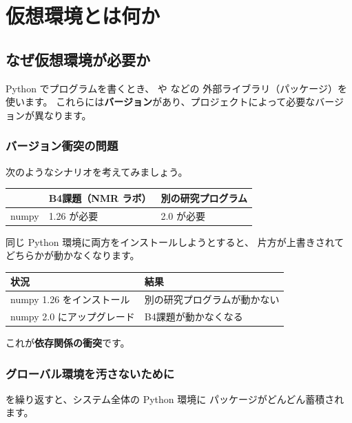 \chapter{仮想環境とは何か}

\section{なぜ仮想環境が必要か}

Python でプログラムを書くとき、 や  などの
外部ライブラリ（パッケージ）を使います。
これらには\textbf{バージョン}があり、プロジェクトによって必要なバージョンが異なります。

\subsection{バージョン衝突の問題}

次のようなシナリオを考えてみましょう。

\begin{center}
\begin{tabularx}{\linewidth}{lXX}
  \toprule
  & B4課題（NMR ラボ） & 別の研究プログラム \\
  \midrule
  numpy & 1.26 が必要 & 2.0 が必要 \\
  \bottomrule
\end{tabularx}
\end{center}

同じ Python 環境に両方をインストールしようとすると、
片方が上書きされてどちらかが動かなくなります。

\begin{center}
\begin{tabularx}{\linewidth}{lX}
  \toprule
  状況 & 結果 \\
  \midrule
  numpy 1.26 をインストール & 別の研究プログラムが動かない \\
  numpy 2.0 にアップグレード & B4課題が動かなくなる \\
  \bottomrule
\end{tabularx}
\end{center}

これが\textbf{依存関係の衝突}です。

\subsection{グローバル環境を汚さないために}

 を繰り返すと、システム全体の Python 環境に
パッケージがどんどん蓄積されます。

